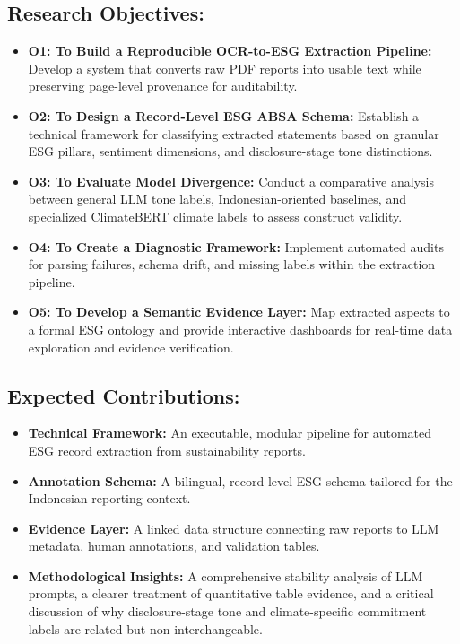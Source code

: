 \documentclass[english, online, cse, master]{dithesis}
\begin{document}
\subsection{Research Objectives:}
\begin{itemize}
\item 

\textbf{O1: To Build a Reproducible OCR-to-ESG Extraction Pipeline:} Develop a system that converts raw PDF reports into usable text while preserving page-level provenance for auditability.\item 

\textbf{O2: To Design a Record-Level ESG ABSA Schema:} Establish a technical framework for classifying extracted statements based on granular ESG pillars, sentiment dimensions, and disclosure-stage tone distinctions.\item 

\textbf{O3: To Evaluate Model Divergence:} Conduct a comparative analysis between general LLM tone labels, Indonesian-oriented baselines, and specialized ClimateBERT climate labels to assess construct validity.\item 

\textbf{O4: To Create a Diagnostic Framework:} Implement automated audits for parsing failures, schema drift, and missing labels within the extraction pipeline.\item 

\textbf{O5: To Develop a Semantic Evidence Layer:} Map extracted aspects to a formal ESG ontology and provide interactive dashboards for real-time data exploration and evidence verification.
\end{itemize}
\subsection{Expected Contributions:}
\begin{itemize}
\item 

\textbf{Technical Framework:} An executable, modular pipeline for automated ESG record extraction from sustainability reports.\item 

\textbf{Annotation Schema:} A bilingual, record-level ESG schema tailored for the Indonesian reporting context.\item 

\textbf{Evidence Layer:} A linked data structure connecting raw reports to LLM metadata, human annotations, and validation tables.\item 

\textbf{Methodological Insights:} A comprehensive stability analysis of LLM prompts, a clearer treatment of quantitative table evidence, and a critical discussion of why disclosure-stage tone and climate-specific commitment labels are related but non-interchangeable.
\end{itemize}
\end{document}
